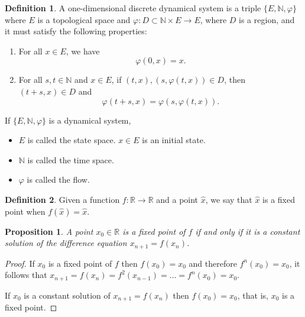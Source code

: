 \documentclass[12pt,a4paper]{report}
\newtheorem{proposicion}{Proposition}[section]
\theoremstyle{definition}
\newtheorem{definicion}{Definition}[section]
\begin{document}
\begin{definicion}

A one-dimensional discrete dynamical system is a triple $\{E,\mathbb{N}, \varphi\}$ where $E$ is a topological space and $\varphi: D \subset \mathbb{N} \times E \to E$, where $D$ is a region, and it must satisfy the following properties:

\begin{enumerate}
    \item For all $x \in E$, we have
    \[
    \varphi(0, x) = x.
    \]

    \item For all $s, t \in \mathbb{N}$ and $x \in E$, if $(t, x), (s, \varphi(t, x)) \in D$, then $(t + s, x) \in D$ and
    \[
    \varphi(t + s, x) = \varphi(s, \varphi(t, x)).
    \]
\end{enumerate}


If $\{E, \mathbb{N}, \varphi\}$ is a dynamical system,
\begin{itemize}
    \item $E$ is called the state space. $x \in E$ is an initial state.
    \item $\mathbb{N}$ is called the time space.
    \item $\varphi$ is called the flow.
\end{itemize}
    
\end{definicion}


\begin{definicion}
Given a function $f: \mathbb{R} \rightarrow \mathbb{R}$ and a point $\hat{x}$, we say that $\hat{x}$ is a fixed point when $f(\hat{x})=\hat{x}$. 
\end{definicion}
 
\begin{proposicion}
A point $x_0 \in \mathbb{R}$ is a fixed point of $f $ if and only if it is a constant solution of the difference equation $x_{n+1} = f(x_n)$.
\end{proposicion}

\begin{proof}

If $x_0$ is a fixed point of $f$ then $f(x_0) = x_0$ and therefore $f^n(x_0) = x_0$, it follows that $x_{n+1} = f(x_n) = f^2(x_{n-1}) = \ldots = f^n(x_0) = x_0$.

If $x_0$ is a constant solution of $x_{n+1} = f(x_n)$ then $f(x_0) = x_0$, that is, $x_0$ is a fixed point.

\end{proof}
\end{document}
